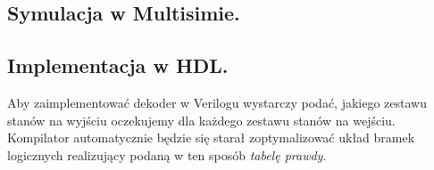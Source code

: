 \documentclass[a4paper,oneside]{report}
\newcommand{\bcdtoseg}{\texttt{bcd\textunderscore to\textunderscore 7seg}}
\begin{document}
\subsection{Symulacja w Multisimie.}
\subsection{Implementacja w HDL.}
Aby zaimplementować dekoder w Verilogu wystarczy podać, jakiego
zestawu stanów na wyjściu oczekujemy dla każdego zestawu stanów na
wejściu. Kompilator automatycznie będzie się starał zoptymalizować
układ bramek logicznych realizujący podaną w ten sposób
\emph{tabelę prawdy}.


\end{document}
